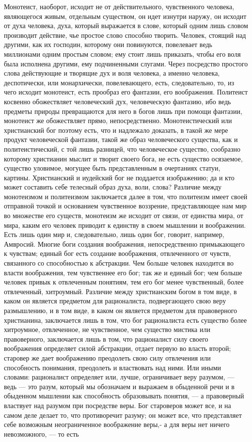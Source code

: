 \documentclass[12pt]{article}
\begin{document}
Монотеист, наоборот, исходит не от действительного, чувственного человека, являющегося живым, отдельным существом, он идет изнутри наружу, он исходит от духа человека, духа, который выражается в слове, который одним лишь словом производит действие, чье простое слово способно творить. Человек, стоящий над другими, как их господин, которому они повинуются, повелевает ведь миллионами одним простым словом; ему стоит лишь приказать, чтобы его воля была исполнена другими, ему подчиненными слугами. Через посредство простого слова действующие и творящие дух и воля человека, а именно человека, деспотически, или монархически, повелевающего, есть, следовательно, то, из чего исходит монотеист, есть прообраз его фантазии, его воображения. Политеист косвенно обожествляет человеческий дух, человеческую фантазию, ибо ведь предметы природы превращаются для него в богов лишь при помощи фантазии, монотеист же обожествляет прямо, непосредственно. Монотеистический или христианский бог поэтому есть, что и надлежало доказать, в такой же мере продукт человеческой фантазии, такой же образ человеческого существа, как и политеистический, с той лишь разницей, что человеческое существо, сообразно которому христианин мыслит и творит своего бога, не есть существо осязаемое, существо уловимое, могущее быть представленным в очертаниях статуи, картины. Христианский и иудейский бог не поддается изображению; да и кто может составить себе телесный образ духа, воли, слова? Различие между монотеизмом и политеизмом заключается далее в том, что политеизм имеет своей отправной точкой и основанием чувственное воззрение, представляющее нам мир во множестве его существ, монотеизм же исходит от связи, от единства мира, от мира, каким его человек приводит к единству в своем мышлении и воображении. Есть лишь один мир и, следовательно, лишь один бог, говорит, например, Амвросий. Многие боги создания воображения, непосредственно примыкающего к чувствам; единый бог есть создание воображения, отвлеченного от чувств, связанного со способностью к абстракции. Чем больше человек находится во власти воображения, тем чувственнее его бог; так же и единый бог; чем больше человек привык к отвлеченным понятиям, тем его бог менее чувственный, более отвлеченный, хитроумный. Различие между христианским богом в том виде, в каком он является предметом для рационалиста, подвергающего свою веру размышлению, и в том виде, в каком он является предметом для правоверного христианина, заключается лишь в том, что бог рационалиста есть существо более хитроумное, отвлеченное, не чувственное, чем существо мистика или правоверного, заключается лишь в том, что рационалист силу своего воображения определяет силой абстракции, отдает первую во власть второй; старовер же дает воображению преодолеть свою силу отвлечения или способность понимания, преодолеть и властвовать над ними. Или иными словами: рационалист определяет или, лучше, ограничивает веру разумом, --- ведь --- это разум, который мы обозначаем и выражаем в обыденной речи и в обыденном мышлении как способность образовывать понятия, --- а правоверный властвует над разумом при посредстве веры. Бог староверов может все, и на самом деле делает то, что противоречит разуму; он может все, что представляет себе возможным неограниченное воображение веры,- а для веры нет ничего невозможного, --- то есть 
\end{document}
